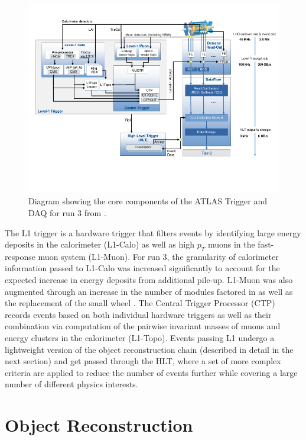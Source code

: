 \begin{figure}
\centering
    \includegraphics[width=1.0\textwidth]{images/Trigger_System.png}
    \caption{Diagram showing the core components of the ATLAS Trigger and DAQ for run 3 from \cite{atlas-run3-setup}.}
    \label{fig:Trigger_System}
\end{figure}

The L1 trigger is a hardware trigger that filters events by identifying large energy deposits in the calorimeter 
(L1-Calo) as well as high $p_T$ muons in the fast-response muon system (L1-Muon). For run 3, the granularity of 
calorimeter information passed to L1-Calo was increased significantly to account for the expected increase in 
energy deposits from additional pile-up. L1-Muon was also augmented through an increase in the number of modules 
factored in as well as the replacement of the small wheel \cite{atlas-run3-trigger}. The Central Trigger Processor 
(CTP) records events based on both individual hardware triggers as well as their combination via computation of the 
pairwise invariant masses of muons and energy clusters in the calorimeter (L1-Topo). Events passing L1 undergo a 
lightweight version of the object reconstruction chain (described in detail in the next section) and get passed 
through the HLT, where a set of more complex criteria are applied to reduce the number of events further while 
covering a large number of different physics interests.

\section{Object Reconstruction}

